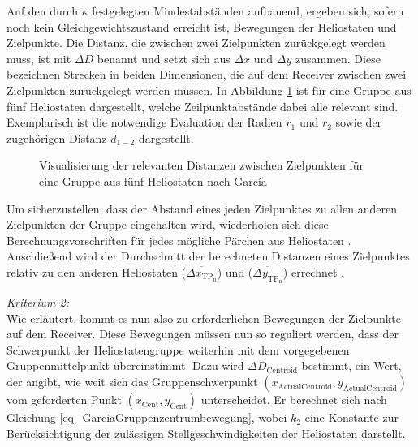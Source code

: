 Auf den durch $\kappa$ festgelegten Mindestabständen aufbauend, ergeben sich, sofern noch kein Gleichgewichtszustand erreicht ist, Bewegungen der Heliostaten und Zielpunkte.
Die Distanz, die zwischen zwei Zielpunkten zurückgelegt werden muss, ist mit $\Delta D$ benannt und setzt sich aus $\Delta x$ und $\Delta y$ zusammen.
Diese bezeichnen Strecken in beiden Dimensionen, die auf dem Receiver zwischen zwei Zielpunkten zurückgelegt werden müssen.
In Abbildung \ref{fig_AbständeGarcia} ist für eine Gruppe aus fünf Heliostaten dargestellt, welche Zeilpunktabstände dabei alle relevant sind.
Exemplarisch ist die notwendige Evaluation der Radien $r_1$ und $r_2$ sowie der zugehörigen Distanz $d_{1-2}$ dargestellt.

\pagebreak
\begin{figure}[h!]
    \centering
    \setlength{\fboxsep}{1pt}
    \setlength{\fboxrule}{1pt}
    \caption[Visualisierung der relevanten Distanzen zwischen Zielpunkten für eine Gruppe aus fünf Heliostaten nach García]{Visualisierung der relevanten Distanzen zwischen Zielpunkten für eine Gruppe aus fünf Heliostaten nach García \cite[S.7]{Garcia2}}
    \label{fig_AbständeGarcia}
\end{figure}


Um sicherzustellen, dass der Abstand eines jeden Zielpunktes zu allen anderen Zielpunkten der Gruppe eingehalten wird, wiederholen sich diese Berechnungsvorschriften für jedes mögliche Pärchen aus Heliostaten \cite[S.9]{Garcia2}.
Anschließend wird der Durchschnitt der berechneten Distanzen eines Zielpunktes relativ zu den anderen Heliostaten ($\overline{\Delta x_{\mathrm{TP_n}}}$) und ($\overline{\Delta y_{\mathrm{TP_n}}}$) errechnet \cite[S.10]{Garcia2}.

\pagebreak
\textit{Kriterium 2:}\\
Wie erläutert, kommt es nun also zu erforderlichen Bewegungen der Zielpunkte auf dem Receiver.
Diese Bewegungen müssen nun so reguliert werden, dass der Schwerpunkt der Heliostatengruppe weiterhin mit dem vorgegebenen Gruppenmittelpunkt übereinstimmt.
Dazu wird $\Delta D_{\mathrm{Centroid}}$ bestimmt, ein Wert, der angibt, wie weit sich das Gruppenschwerpunkt $(x_{\mathrm{Actual Centroid}}, y_{\mathrm{Actual Centroid}})$ vom geforderten Punkt $(x_{\mathrm{Cent}}, y_{\mathrm{Cent}})$ unterscheidet.
Er berechnet sich nach Gleichung \ref{eq_GarciaGruppenzentrumbewegung}, wobei $k_2$ eine Konstante zur Berücksichtigung der zulässigen Stellgeschwindigkeiten der Heliostaten darstellt. \cite[S.10]{Garcia2}

